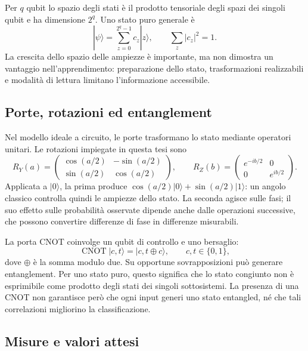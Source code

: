 Per \(q\) qubit lo spazio degli stati è il prodotto tensoriale degli
spazi dei singoli qubit e ha dimensione \(2^q\). Uno stato puro generale è
\begin{equation}
 |\psi\rangle=\sum_{z=0}^{2^q-1}c_z|z\rangle,
 \qquad \sum_z|c_z|^2=1.
\end{equation}
La crescita dello spazio delle ampiezze è importante, ma non dimostra
un vantaggio nell'apprendimento: preparazione dello stato, trasformazioni
realizzabili e modalità di lettura limitano l'informazione accessibile.

\subsection{Porte, rotazioni ed entanglement}

Nel modello ideale a circuito, le porte trasformano lo stato mediante
operatori unitari. Le rotazioni impiegate in questa tesi sono
\begin{equation}
 R_Y(a)=
 \begin{pmatrix}\cos(a/2)&-\sin(a/2)\\
 \sin(a/2)&\cos(a/2)\end{pmatrix},
 \qquad
 R_Z(b)=
 \begin{pmatrix}e^{-ib/2}&0\\0&e^{ib/2}\end{pmatrix}.
\end{equation}
Applicata a \(|0\rangle\), la prima produce
\(\cos(a/2)|0\rangle+\sin(a/2)|1\rangle\): un angolo classico
controlla quindi le ampiezze dello stato. La seconda agisce sulle fasi;
il suo effetto sulle probabilità osservate dipende anche dalle operazioni
successive, che possono convertire differenze di fase in differenze
misurabili.

La porta CNOT coinvolge un qubit di controllo e uno bersaglio:
\begin{equation}
 \operatorname{CNOT}|c,t\rangle=|c,t\oplus c\rangle,
 \qquad c,t\in\{0,1\},
\end{equation}
dove \(\oplus\) è la somma modulo due. Su opportune sovrapposizioni
può generare entanglement. Per uno stato puro, questo significa che lo
stato congiunto non è esprimibile come prodotto degli stati dei singoli
sottosistemi. La presenza di una CNOT non garantisce però che ogni input
generi uno stato entangled, né che tali correlazioni migliorino la
classificazione.

\subsection{Misure e valori attesi}

